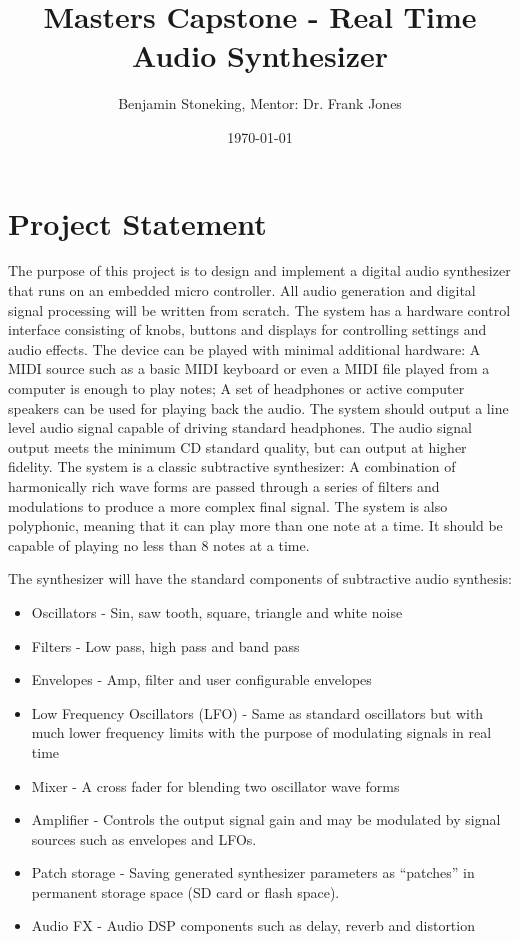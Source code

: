 \documentclass[12pt]{article}
\title{Masters Capstone - Real Time Audio Synthesizer}
\author{Benjamin Stoneking, Mentor: Dr. Frank Jones}
\affil{Computer Science Department, Utah Valley University}
\date{\today}
\begin{document}
\maketitle

\section{Project Statement}
The purpose of this project is to design and implement a digital audio synthesizer that runs on an embedded micro controller. All audio generation and digital signal processing will be written from scratch. The system has a hardware control interface consisting of knobs, buttons and displays for controlling settings and audio effects. The device can be played with minimal additional hardware: A MIDI source such as a basic MIDI keyboard or even a MIDI file played from a computer is enough to play notes; A set of headphones or active computer speakers can be used for playing back the audio. The system should output a line level audio signal capable of driving standard headphones. The audio signal output meets the minimum CD standard quality, but can output at higher fidelity. The system is a classic subtractive synthesizer: A combination of harmonically rich wave forms are passed through a series of filters and modulations to produce a more complex final signal. \cite{rise_2016} The system is also polyphonic, meaning that it can play more than one note at a time. It should be capable of playing no less than 8 notes at a time.

\pagebreak

The synthesizer will have the standard components of subtractive audio synthesis:

\begin{itemize}
    \item Oscillators - Sin, saw tooth, square, triangle and white noise \cite{tagi_2019}
    \item Filters - Low pass, high pass and band pass \cite{musictech}
    \item Envelopes - Amp, filter and user configurable envelopes \cite{hass_2021}
    \item Low Frequency Oscillators (LFO) - Same as standard oscillators but with much lower frequency limits with the purpose of modulating signals in real time \cite{paris_2022}
    \item Mixer - A cross fader for blending two oscillator wave forms
    \item Amplifier - Controls the output signal gain and may be modulated by signal sources such as envelopes and LFOs.
    \item Patch storage - Saving generated synthesizer parameters as “patches” in permanent storage space (SD card or flash space).
    \item Audio FX - Audio DSP components such as delay, reverb and distortion \cite{farnell_2010}
\end{itemize}
\end{document}
